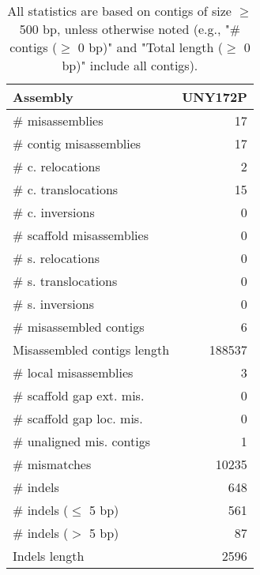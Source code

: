 \documentclass[12pt,a4paper]{article}
\begin{document}
\begin{table}[ht]
\begin{center}
\caption{All statistics are based on contigs of size $\geq$ 500 bp, unless otherwise noted (e.g., "\# contigs ($\geq$ 0 bp)" and "Total length ($\geq$ 0 bp)" include all contigs).}
\begin{tabular}{|l*{1}{|r}|}
\hline
Assembly & UNY172P \\ \hline
\# misassemblies & 17 \\ \hline
\hspace{2mm}\# contig misassemblies & 17 \\ \hline
\hspace{5mm}\# c. relocations & 2 \\ \hline
\hspace{5mm}\# c. translocations & 15 \\ \hline
\hspace{5mm}\# c. inversions & 0 \\ \hline
\hspace{2mm}\# scaffold misassemblies & 0 \\ \hline
\hspace{5mm}\# s. relocations & 0 \\ \hline
\hspace{5mm}\# s. translocations & 0 \\ \hline
\hspace{5mm}\# s. inversions & 0 \\ \hline
\# misassembled contigs & 6 \\ \hline
Misassembled contigs length & 188537 \\ \hline
\# local misassemblies & 3 \\ \hline
\# scaffold gap ext. mis. & 0 \\ \hline
\# scaffold gap loc. mis. & 0 \\ \hline
\# unaligned mis. contigs & 1 \\ \hline
\# mismatches & 10235 \\ \hline
\# indels & 648 \\ \hline
\hspace{5mm}\# indels ($\leq$ 5 bp) & 561 \\ \hline
\hspace{5mm}\# indels ($>$ 5 bp) & 87 \\ \hline
Indels length & 2596 \\ \hline
\end{tabular}
\end{center}
\end{table}
\end{document}
